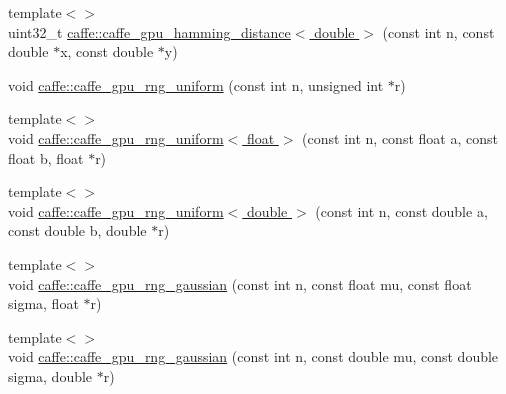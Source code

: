 \begin{DoxyCompactItemize}
\item 
{\footnotesize template$<$$>$ }\\uint32\+\_\+t \hyperlink{namespacecaffe_ae6f219822c198a5ebfc14b79d56aac7b}{caffe\+::caffe\+\_\+gpu\+\_\+hamming\+\_\+distance$<$ double $>$} (const int n, const double $\ast$x, const double $\ast$y)
\item 
void \hyperlink{namespacecaffe_aee22d10249c5dd157d15a79bb8891bf8}{caffe\+::caffe\+\_\+gpu\+\_\+rng\+\_\+uniform} (const int n, unsigned int $\ast$r)
\item 
{\footnotesize template$<$$>$ }\\void \hyperlink{namespacecaffe_a077eb739db57fe3655d0def343fe0c4c}{caffe\+::caffe\+\_\+gpu\+\_\+rng\+\_\+uniform$<$ float $>$} (const int n, const float a, const float b, float $\ast$r)
\item 
{\footnotesize template$<$$>$ }\\void \hyperlink{namespacecaffe_a31407c00a3d32c77016b8382ae19ebb2}{caffe\+::caffe\+\_\+gpu\+\_\+rng\+\_\+uniform$<$ double $>$} (const int n, const double a, const double b, double $\ast$r)
\item 
{\footnotesize template$<$$>$ }\\void \hyperlink{namespacecaffe_aeb58f68cc8d5f8b7dba8537dc1932cb9}{caffe\+::caffe\+\_\+gpu\+\_\+rng\+\_\+gaussian} (const int n, const float mu, const float sigma, float $\ast$r)
\item 
{\footnotesize template$<$$>$ }\\void \hyperlink{namespacecaffe_a7536554fa0f49cb776354d384689e38b}{caffe\+::caffe\+\_\+gpu\+\_\+rng\+\_\+gaussian} (const int n, const double mu, const double sigma, double $\ast$r)
\end{DoxyCompactItemize}
